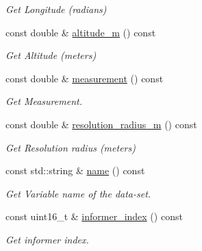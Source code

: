 \begin{DoxyCompactItemize}
\begin{DoxyCompactList}\small\item\em Get Longitude (radians) \end{DoxyCompactList}\item 
const double \& \hyperlink{classosse_1_1collaborate_1_1_packet_raw_a0df4fa194dac316e9ca1e8e6e9beec0b}{altitude\+\_\+m} () const
\begin{DoxyCompactList}\small\item\em Get Altitude (meters) \end{DoxyCompactList}\item 
const double \& \hyperlink{classosse_1_1collaborate_1_1_packet_raw_a2a99f3e00c4b1fdf018d3499cc1b73ca}{measurement} () const
\begin{DoxyCompactList}\small\item\em Get Measurement. \end{DoxyCompactList}\item 
const double \& \hyperlink{classosse_1_1collaborate_1_1_packet_raw_a82b6da77df7720c9c3cd12cc9b6b58c4}{resolution\+\_\+radius\+\_\+m} () const
\begin{DoxyCompactList}\small\item\em Get Resolution radius (meters) \end{DoxyCompactList}\item 
const std\+::string \& \hyperlink{classosse_1_1collaborate_1_1_packet_raw_a3ed74a42ebc594d47cf3ab92b7b5b44b}{name} () const
\begin{DoxyCompactList}\small\item\em Get Variable name of the data-\/set. \end{DoxyCompactList}\item 
const uint16\+\_\+t \& \hyperlink{classosse_1_1collaborate_1_1_packet_raw_ab0a721308e65ca879e2976b75c8f891c}{informer\+\_\+index} () const
\begin{DoxyCompactList}\small\item\em Get informer index. \end{DoxyCompactList}\end{DoxyCompactItemize}
